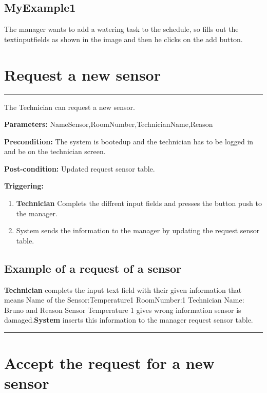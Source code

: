 \subsection{MyExample1}
The manager wants to add a watering task to the schedule, so fills out the
textinputfields as shown in the image and then he clicks on the add button.



\break

\section{Request a new sensor}

\hrule
\hfill
\vspace{0.5cm}
\label{operation:Request a new sensor}

The Technician can request a new sensor.
\begin{description}
\item \textbf{Parameters:} NameSensor,RoomNumber,TechnicianName,Reason
\item \textbf{Precondition:} The system is bootedup and the technician has to be
logged in and be on the technician screen.
\item \textbf{Post-condition:} Updated request sensor table.

\item \textbf{Triggering:}
\begin{enumerate}
\item \textbf{Technician} Complets the diffrent input fields and presses the
button push to the manager.
\item System sends the information to the manager by updating the request
sensor table.
\end{enumerate}
\end{description}

\subsection{Example of a request of a sensor}
\textbf{Technician} complets the input text field with their given information
that means Name of the Sensor:Temperature1 RoomNumber:1 Technician Name: Bruno
and Reason Sensor Temperature 1 gives wrong information sensor is
damaged.\textbf{System} inserts this information to the manager request sensor
table.
\hfill
\vspace{0.5cm}
\hrule

\section{Accept the request for a new sensor}

